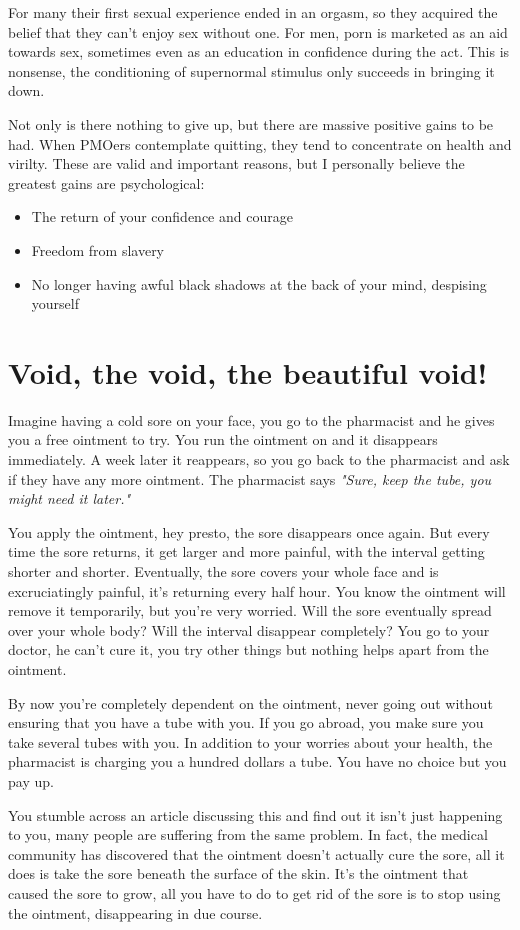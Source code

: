 \documentclass[easypeasy.tex]{subfiles}
\begin{document}
For many their first sexual experience ended in an orgasm, so they acquired the belief that they can't enjoy sex without one. For men, porn is marketed as an aid towards sex, sometimes even as an education in confidence during the act. This is nonsense, the conditioning of supernormal stimulus only succeeds in bringing it down.

Not only is there nothing to give up, but there are massive positive gains to be had. When PMOers contemplate quitting, they tend to concentrate on health and virilty. These are valid and important reasons, but I personally believe the greatest gains are psychological:
\begin{itemize}
  \item The return of your confidence and courage
  \item Freedom from slavery
  \item No longer having awful black shadows at the back of your mind, despising yourself
\end{itemize}
\section{Void, the void, the beautiful void!}
Imagine having a cold sore on your face, you go to the pharmacist and he gives you a free ointment to try. You run the ointment on and it disappears immediately. A week later it reappears, so you go back to the pharmacist and ask if they have any more ointment. The pharmacist says \textit{"Sure, keep the tube, you might need it later."}

You apply the ointment, hey presto, the sore disappears once again. But every time the sore returns, it get larger and more painful, with the interval getting shorter and shorter. Eventually, the sore covers your whole face and is excruciatingly painful, it's returning every half hour. You know the ointment will remove it temporarily, but you're very worried. Will the sore eventually spread over your whole body? Will the interval disappear completely? You go to your doctor, he can't cure it, you try other things but nothing helps apart from the ointment.

By now you're completely dependent on the ointment, never going out without ensuring that you have a tube with you. If you go abroad, you make sure you take several tubes with you. In addition to your worries about your health, the pharmacist is charging you a hundred dollars a tube. You have no choice but you pay up.

You stumble across an article discussing this and find out it isn't just happening to you, many people are suffering from the same problem. In fact, the medical community has discovered that the ointment doesn't actually cure the sore, all it does is take the sore beneath the surface of the skin. It's the ointment that caused the sore to grow, all you have to do to get rid of the sore is to stop using the ointment, disappearing in due course.
\end{document}
